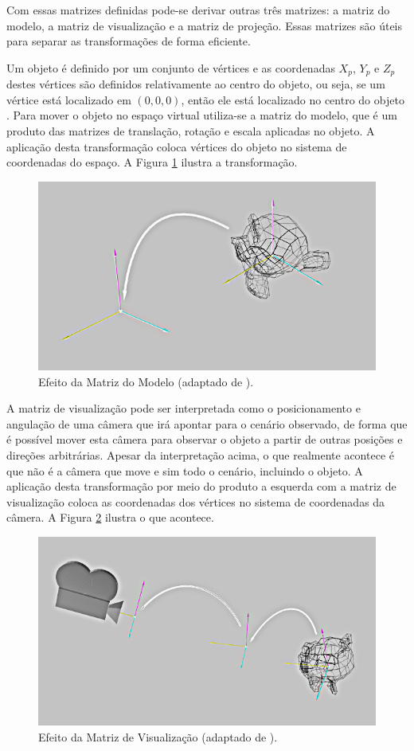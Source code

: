 {Com essas matrizes definidas pode-se derivar outras três matrizes: a matriz do modelo, a matriz de visualização e a matriz de projeção. Essas matrizes são úteis para separar as transformações de forma eficiente.

Um objeto é definido por um conjunto de vértices e as coordenadas $X_p$, $Y_p$ e $Z_p$ destes vértices são definidos relativamente ao centro do objeto, ou seja, se um vértice está localizado em $(0,0,0)$, então ele está localizado no centro do objeto \cite{openGlTutorial}. Para mover o objeto no espaço virtual utiliza-se a matriz do modelo, que é um produto das matrizes de translação, rotação e escala aplicadas no objeto. A aplicação desta transformação  coloca vértices do objeto no sistema de coordenadas do espaço. A Figura \ref{fig:mat_modelo} ilustra a transformação.

\begin{figure}[h!]
\centering
\includegraphics[width=.5\linewidth]{figs/TG_model_matrix_neg.png}
\caption{Efeito da Matriz do Modelo (adaptado de \cite{openGlTutorial}).}
\label{fig:mat_modelo}
\end{figure}


A matriz de visualização pode ser interpretada como o posicionamento e angulação de uma câmera que irá apontar para o cenário observado, de forma que é possível mover esta câmera para observar o objeto a partir de outras posições e direções arbitrárias. Apesar da interpretação acima, o  que realmente acontece é que não é a câmera que move e sim todo o cenário, incluindo o objeto. A aplicação desta transformação por meio do produto a esquerda com a matriz de visualização coloca as coordenadas dos vértices no sistema de coordenadas da câmera. A Figura \ref{fig:mat_visao} ilustra o que acontece.

\begin{figure}[h!]
\centering
\includegraphics[width=.5\linewidth]{figs/TG_view_matrix_neg.png}
\caption{Efeito da Matriz de Visualização (adaptado de \cite{openGlTutorial}).}
\label{fig:mat_visao}
\end{figure}

}
